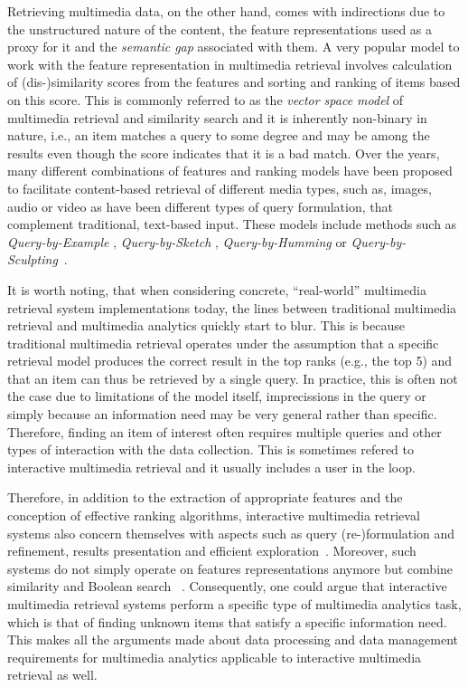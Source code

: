Retrieving multimedia data, on the other hand, comes with indirections due to the unstructured nature of the content, the feature representations used as a proxy for it and the \emph{semantic gap} \cite{Blanken:2007multimedia, Rossetto:2018Multi} associated with them. A very popular model to work with the feature representation in multimedia retrieval involves calculation of (dis-)similarity scores from the features and sorting and ranking of items based on this score. This is commonly referred to as the \emph{vector space model} of multimedia retrieval and similarity search \cite{Zezula:2006Similarity} and it is inherently non-binary in nature, i.e., an item matches a query to some degree and may be among the results even though the score indicates that it is a bad match. Over the years, many different combinations of features and ranking models have been proposed to facilitate content-based retrieval of different media types, such as, images, audio or video \cite{Hu:2011Survey,Dharani:2013Survey,Murthy:2018Content} as have been different types of query formulation, that complement traditional, text-based input. These models include methods such as \emph{Query-by-Example} \cite{Kelly:1995Query}, \emph{Query-by-Sketch} \cite{Sciascio:1999Content}, \emph{Query-by-Humming} \cite{Ghias:1995query} or \emph{Query-by-Sculpting}~\cite{Boerlin:20203d}.

It is worth noting, that when considering concrete, ``real-world'' multimedia retrieval system implementations today, the lines between traditional multimedia retrieval and multimedia analytics quickly start to blur. This is because traditional multimedia retrieval operates under the assumption that a specific retrieval model produces the correct result in the top ranks (e.g., the top 5) and that an item can thus be retrieved by a single query. In practice, this is often not the case due to limitations of the model itself, imprecissions in the query or simply because an information need may be very general rather than specific. Therefore, finding an item of interest often requires multiple queries and other types of interaction with the data collection. This is sometimes refered to interactive multimedia retrieval and it usually includes a user in the loop.

Therefore, in addition to the extraction of appropriate features and the conception of effective ranking algorithms, interactive multimedia retrieval systems also concern themselves with aspects such as query (re-)formulation and refinement, results presentation and efficient exploration~\cite{Lokovc:2019Interactive}. Moreover, such systems do not simply operate on features representations anymore but combine similarity and Boolean search ~\cite{Rossetto:2020Interactive}. Consequently, one could argue that interactive multimedia retrieval systems perform a specific type of multimedia analytics task, which is that of finding unknown items that satisfy a specific information need. This makes all the arguments made about data processing and data management requirements for multimedia analytics applicable to interactive multimedia retrieval as well.

